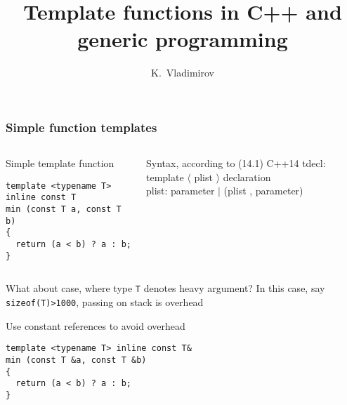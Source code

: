\documentclass{beamer}
\title[Template functions] {Template functions in C++ and generic programming}
\author[Vladimirov]{K.~Vladimirov}
\begin{document}
\frame{\titlepage}

\begin{frame}[fragile]
\frametitle{Simple function templates}

\begin{columns}[c]
\begin{column}{.5\textwidth}
\begin{block}{Simple template function}
\begin{lstlisting}[basicstyle=\tiny]
template <typename T> inline const T
min (const T a, const T b)
{
  return (a < b) ? a : b;
}
\end{lstlisting}
\end{block}
\end{column}
\begin{column}{.5\textwidth}
\begin{block}{Syntax, according to (14.1) C++14}
\small{
tdecl: template $\langle$ plist $\rangle$ declaration\\
plist: parameter $\mid$ (plist , parameter)
}
\end{block}
\end{column}
\end{columns}\pause

\begin{alertblock}{What about case, where type \lstinline!T! denotes heavy argument?}
In this case, say \lstinline!sizeof(T)>1000!, passing on stack is overhead
\end{alertblock}\pause

\begin{block}{Use constant references to avoid overhead}
\begin{lstlisting}[basicstyle=\small]
template <typename T> inline const T&
min (const T &a, const T &b)
{
  return (a < b) ? a : b;
}
\end{lstlisting}
\end{block}

\end{frame}
\end{document}
